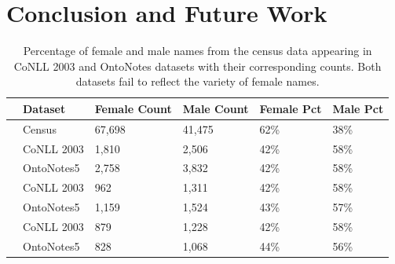 


\section{Conclusion and Future Work}
\begin{table}
\begin{tabular}{ p{0.3cm} p{2cm} p{1.0cm} p{1.0cm} p{1cm} p{1cm}}
 \toprule
& \textbf{Dataset} & \textbf{Female Count} &\textbf{Male Count}&\textbf{Female Pct}& \textbf{Male Pct}\\
 \midrule
 & Census & 67,698 & 41,475 & 62\% & 38\% \\[0.5pt]
 \midrule
 \parbox[t]{2mm}{}
 & CoNLL 2003& 1,810 & 2,506&42\%&58\%\\[0.5pt]
 & OntoNotes5& 2,758&3,832&42\%&58\%\\[0.5pt]
 \midrule
 \parbox[t]{2mm}{} &
   CoNLL 2003&962&1,311&42\%&58\%\\[0.5pt]
 & OntoNotes5&1,159&1,524&43\%&57\%\\[0.5pt]
 \midrule
 \parbox[t]{2mm}{} & 
   CoNLL 2003&879&1,228&42\%&58\%\\[0.5pt]
 & OntoNotes5&828&1,068&44\%&56\%\\[0.5pt]
 \bottomrule
\end{tabular}
\caption{Percentage of female and male names from the census data appearing in CoNLL 2003 and OntoNotes datasets with their corresponding counts. Both datasets fail to reflect the variety of female names.}
\label{data_stats_table}
\end{table}

